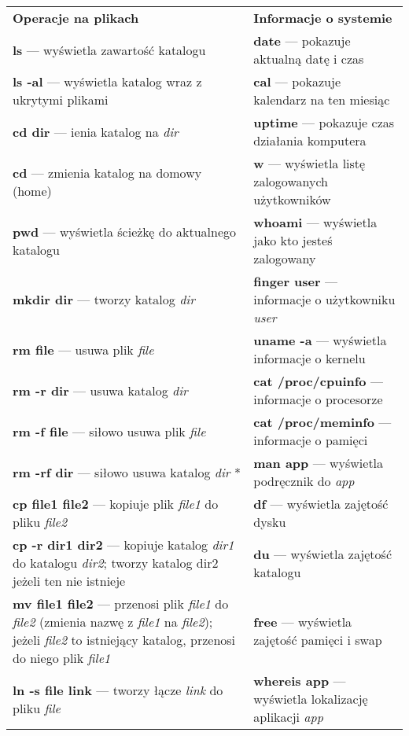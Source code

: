 \label{polecenia}
\tiny
\begin{tabularx}{\linewidth}{p{8.5cm}|p{8.5cm}}
\hline
\cellcolor[gray]{0.90}\textbf{\textcolor{ubuntu_orange}{Operacje na plikach}} & \cellcolor[gray]{0.90}\textbf{\textcolor{ubuntu_orange}{Informacje o systemie}}\\
\textbf{ls} --- wyświetla zawartość katalogu & \textbf{date} --- pokazuje aktualną datę i czas\\
\textbf{ls -al} --- wyświetla katalog wraz z ukrytymi plikami & \textbf{cal} --- pokazuje kalendarz na ten miesiąc\\
\textbf{cd dir} --- ienia katalog na \textit{dir} & \textbf{uptime} --- pokazuje czas działania komputera\\
\textbf{cd} --- zmienia katalog na domowy (home) & \textbf{w} --- wyświetla listę zalogowanych użytkowników\\
\textbf{pwd} --- wyświetla ścieżkę do aktualnego katalogu & \textbf{whoami} --- wyświetla jako kto jesteś zalogowany\\
\textbf{mkdir dir} --- tworzy katalog \textit{dir} & \textbf{finger user} --- informacje o użytkowniku \textit{user}\\
\textbf{rm file} --- usuwa plik \textit{file} & \textbf{uname -a} --- wyświetla informacje o kernelu\\
\textbf{rm -r dir} --- usuwa katalog \textit{dir} & \textbf{cat /proc/cpuinfo} --- informacje o procesorze\\
\textbf{rm -f file} --- siłowo usuwa plik \textit{file} & \textbf{cat /proc/meminfo} --- informacje o pamięci\\
\textbf{rm -rf dir} --- siłowo usuwa katalog \textit{dir} * & \textbf{man app} --- wyświetla podręcznik do \textit{app}\\
\textbf{cp file1 file2} --- kopiuje plik \textit{file1} do pliku \textit{file2} & \textbf{df} --- wyświetla zajętość dysku\\
\textbf{cp -r dir1 dir2} --- kopiuje katalog \textit{dir1} do katalogu \textit{dir2}; tworzy katalog dir2 jeżeli ten nie istnieje & \textbf{du} --- wyświetla zajętość katalogu\\
\textbf{mv file1 file2} --- przenosi plik \textit{file1} do \textit{file2} (zmienia nazwę z \textit{file1} na \textit{file2}); jeżeli \textit{file2} to istniejący katalog, przenosi do niego plik \textit{file1} & \textbf{free} --- wyświetla zajętość pamięci i swap\\
\textbf{ln -s file link} --- tworzy łącze \textit{link} do pliku \textit{file} & \textbf{whereis app} --- wyświetla lokalizację aplikacji \textit{app}\\

\end{tabularx}
